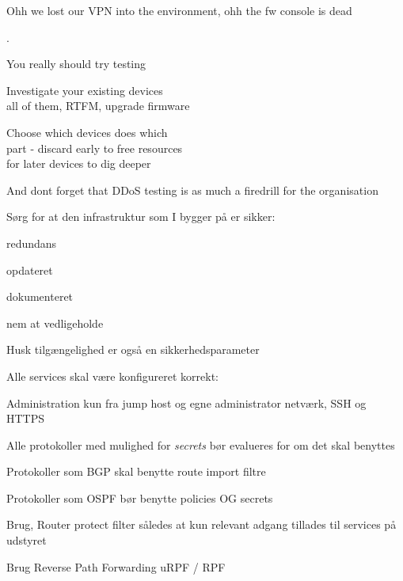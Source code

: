 \documentclass[Screen16to9,17pt]{foils}
\begin{document}
\vskip 1cm
\centerline{Ohh we lost our VPN into the environment, ohh the fw console is dead}



.
\begin{list1}
\item You really should try testing
\item Investigate your existing devices\\
all of them, RTFM, upgrade firmware
\item Choose which devices does which\\
part - discard early to free resources\\
for later devices to dig deeper
\end{list1}

\vskip 3cm
\centerline{And dont forget that DDoS testing is as much a firedrill for the organisation}



\begin{list1}
\item Sørg for at den infrastruktur som I bygger på er sikker:
\begin{list2}
 \item redundans
       \item opdateret
        \item dokumenteret
        \item nem at vedligeholde
\end{list2}

\item  Husk tilgængelighed er også en sikkerhedsparameter
\end{list1}



\begin{list1}
\item Alle services skal være konfigureret korrekt:
\begin{list2}
\item Administration kun fra jump host og egne administrator netværk, SSH og HTTPS
\item Alle protokoller med mulighed for \emph{secrets} bør evalueres for om det skal benyttes
\item Protokoller som BGP skal benytte route import filtre
\item Protokoller som OSPF bør benytte policies OG secrets
\item Brug, Router protect filter således at kun relevant adgang tillades til services på udstyret
\item Brug Reverse Path Forwarding uRPF / RPF
\end{list2}
\end{list1}
\end{document}
